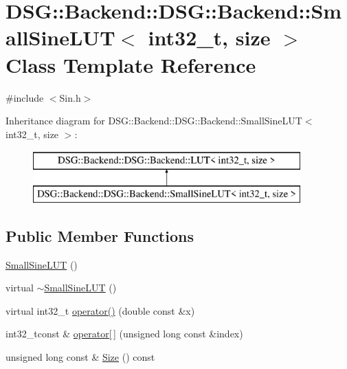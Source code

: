 \hypertarget{classDSG_1_1Backend_1_1DSG_1_1Backend_1_1SmallSineLUT_3_01int32__t_00_01size_01_4}{\section{D\+S\+G\+:\+:Backend\+:\+:D\+S\+G\+:\+:Backend\+:\+:Small\+Sine\+L\+U\+T$<$ int32\+\_\+t, size $>$ Class Template Reference}
\label{classDSG_1_1Backend_1_1DSG_1_1Backend_1_1SmallSineLUT_3_01int32__t_00_01size_01_4}
}


{\ttfamily \#include $<$Sin.\+h$>$}

Inheritance diagram for D\+S\+G\+:\+:Backend\+:\+:D\+S\+G\+:\+:Backend\+:\+:Small\+Sine\+L\+U\+T$<$ int32\+\_\+t, size $>$\+:\begin{figure}[H]
\begin{center}
\leavevmode
\includegraphics[height=2.000000cm]{classDSG_1_1Backend_1_1DSG_1_1Backend_1_1SmallSineLUT_3_01int32__t_00_01size_01_4}
\end{center}
\end{figure}
\subsection*{Public Member Functions}
\begin{DoxyCompactItemize}
\item 
\hyperlink{classDSG_1_1Backend_1_1DSG_1_1Backend_1_1SmallSineLUT_3_01int32__t_00_01size_01_4_abef6922af5561ae0edfb55b3307dd918}{Small\+Sine\+L\+U\+T} ()
\item 
virtual \hyperlink{classDSG_1_1Backend_1_1DSG_1_1Backend_1_1SmallSineLUT_3_01int32__t_00_01size_01_4_af117c305819a522714c29bd00e1079d1}{$\sim$\+Small\+Sine\+L\+U\+T} ()
\item 
virtual int32\+\_\+t \hyperlink{classDSG_1_1Backend_1_1DSG_1_1Backend_1_1SmallSineLUT_3_01int32__t_00_01size_01_4_a6093cb33233f44ac97d15998dc0ba005}{operator()} (double const \&x)
\item 
int32\+\_\+tconst \& \hyperlink{classDSG_1_1Backend_1_1DSG_1_1Backend_1_1LUT_acd6db2fa4eba392de1cbb4795f351f8a}{operator\mbox{[}$\,$\mbox{]}} (unsigned long const \&index)
\item 
unsigned long const \& \hyperlink{classDSG_1_1Backend_1_1DSG_1_1Backend_1_1LUT_a65daa6f46f978a64da1c86089847602d}{Size} () const
\end{DoxyCompactItemize}
